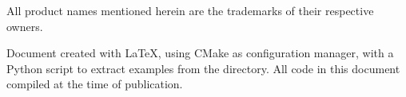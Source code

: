 \begin{minipage}[t][1.0cm][b]{\textwidth}
\begin{center}
All product names mentioned herein are the trademarks of their respective
owners.
\end{center}
\end{minipage}


\begin{minipage}[t][2.7cm][b]{\textwidth}
\begin{center}
Document created with \LaTeX{}, using CMake as
configuration manager, with a Python script to extract examples from the
 directory. All code in this document compiled at
the time of publication.
\end{center}
\end{minipage}
